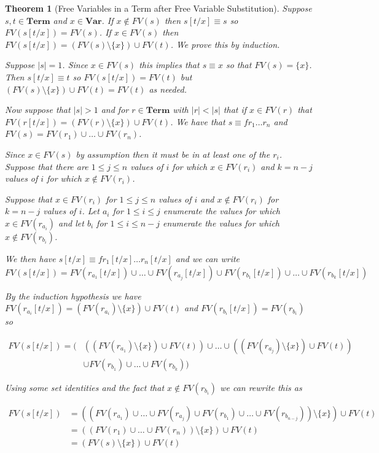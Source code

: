 \documentclass[12pt]{article}
\theoremstyle{break}
\theoremstyle{break}
\newtheorem{theorem}{Theorem}[section]
\theoremstyle{break}
\theoremstyle{break}
\theoremstyle{break}
\newtheorem{informal definition}[definition]{Informal Definition}
\begin{document}
\begin{theorem}[Free Variables in a Term after Free Variable Substitution]
\label{thm:fvtermafterfvsub}
Suppose $s, t \in \textbf{Term}$ and $x\in\textbf{Var}$. If $x \not \in FV(s)$ then $s[t/x] \equiv s$ so $FV(s[t/x]) = FV(s)$. If $x\in FV(s)$ then $FV(s[t/x]) = (FV(s)\setminus \{x\})\cup FV(t)$. We prove this by induction.

Suppose $|s|=1$. Since $x\in FV(s)$ this implies that $s \equiv x$ so that $FV(s)=\{x\}$. Then $s[t/x] \equiv t$ so $FV(s[t/x]) = FV(t)$ but $(FV(s)\setminus\{x\})\cup FV(t) = FV(t)$ as needed.

Now suppose that $|s|>1$ and for $r\in \textbf{Term}$ with $|r|<|s|$ that if $x\in FV(r)$ that $FV(r[t/x]) = (FV(r)\setminus \{x\})\cup FV(t)$. We have that $s\equiv fr_1\ldots r_n$ and $FV(s) = FV(r_1)\cup\ldots\cup FV(r_n)$.

Since $x\in FV(s)$ by assumption then it must be in at least one of the $r_i$. Suppose that there are $1\le j \le n$ values of $i$ for which $x \in FV(r_i)$ and $k = n-j$ values of $i$ for which $x \not \in FV(r_i)$.

Suppose that $x\in FV(r_i)$ for $1\le j \le n$ values of $i$ and $x \not \in FV(r_i)$ for $k = n-j$ values of $i$. Let $a_i$ for $1 \le i \le j$ enumerate the values for which $x\in FV(r_{a_i})$ and let $b_i$ for $1 \le i \le n-j$ enumerate the values for which $x \not \in FV(r_{b_i})$.

We then have $s[t/x] \equiv fr_1[t/x]\ldots r_n[t/x]$ and we can write
$$
FV(s[t/x]) = FV(r_{a_1}[t/x])\cup\ldots\cup FV(r_{a_j}[t/x]) \cup FV(r_{b_1}[t/x])\cup \ldots \cup FV(r_{b_k}[t/x])
$$

By the induction hypothesis we have $FV(r_{a_i}[t/x]) = (FV(r_{a_i})\setminus \{x\}) \cup FV(t)$ and $FV(r_{b_i}[t/x]) = FV(r_{b_i})$ so

\begin{align}
FV(s[t/x]) = \big(&((FV(r_{a_1})\setminus \{x\}) \cup FV(t)) \cup \ldots \cup ((FV(r_{a_j})\setminus \{x\}) \cup FV(t)) \nonumber\\
&\cup FV(r_{b_1}) \cup\ldots \cup FV(r_{b_k})\big) \nonumber
\end{align}

Using some set identities and the fact that $x \not \in FV(r_{b_i})$ we can rewrite this as

\begin{align}
FV(s[t/x]) &= \left(\left(FV(r_{a_1}) \cup \ldots \cup FV(r_{a_j}) \cup FV(r_{b_1}) \cup \ldots \cup FV(r_{b_{n-j}})\right) \setminus \{x\}\right) \cup FV(t) \nonumber\\
&= \left(\left(FV(r_1)\cup \ldots \cup FV(r_n)\right)\setminus \{x\}\right)\cup FV(t) \nonumber\\
&= (FV(s)\setminus \{x\})\cup FV(t) \nonumber
\end{align}
\end{theorem}
\end{document}

